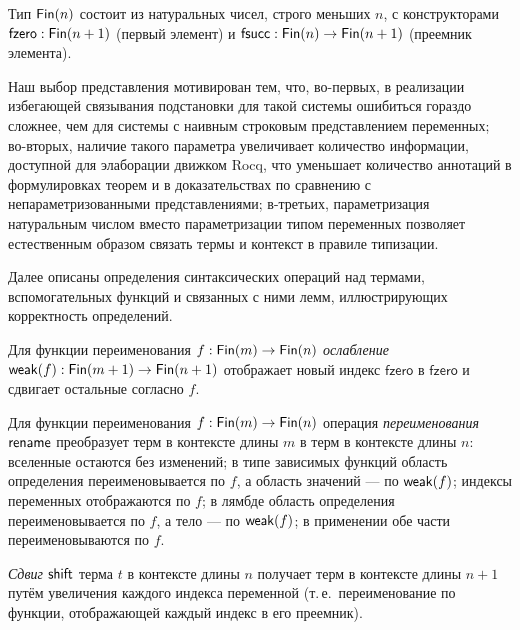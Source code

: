 \begin{definition}
Тип $\mathsf{Fin}(n)$ состоит из натуральных чисел, строго
меньших $n$, с конструкторами
$\mathsf{fzero}:\mathsf{Fin}(n+1)$ (первый элемент) и
$\mathsf{fsucc}:\mathsf{Fin}(n)\to\mathsf{Fin}(n+1)$
(преемник элемента).
\end{definition}

Наш выбор представления мотивирован тем, что,
во-первых, в реализации избегающей связывания
подстановки для такой системы ошибиться гораздо
сложнее, чем для системы с наивным строковым
представлением переменных; во-вторых, наличие такого
параметра увеличивает количество информации, доступной
для элаборации движком Rocq, что уменьшает количество
аннотаций в формулировках теорем и в доказательствах
по сравнению с непараметризованными представлениями;
в-третьих, параметризация натуральным числом вместо
параметризации типом переменных позволяет естественным
образом связать термы и контекст в правиле типизации.

Далее описаны определения синтаксических операций над
термами, вспомогательных функций и связанных с ними
лемм, иллюстрирующих корректность определений.

\begin{definition}
Для функции переименования $f : \mathsf{Fin}(m) \to \mathsf{Fin}(n)$
\emph{ослабление} $\mathsf{weak}(f) : \mathsf{Fin}(m+1) \to \mathsf{Fin}(n+1)$
отображает новый индекс $\mathsf{fzero}$ в
$\mathsf{fzero}$ и сдвигает остальные согласно $f$.
\end{definition}

\begin{definition}[Переименование]
Для функции переименования $f : \mathsf{Fin}(m) \to \mathsf{Fin}(n)$
операция \emph{переименования} $\mathsf{rename}$ преобразует
терм в контексте длины $m$ в терм в контексте длины
$n$: вселенные остаются без изменений; в типе зависимых
функций область определения переименовывается по $f$,
а область значений --- по $\mathsf{weak}(f)$; индексы
переменных отображаются по $f$; в лямбде область
определения переименовывается по $f$, а тело --- по
$\mathsf{weak}(f)$; в применении обе части переименовываются
по $f$.
\end{definition}

\begin{definition}[Сдвиг]
\emph{Сдвиг} $\mathsf{shift}$ терма $t$ в контексте длины $n$
получает терм в контексте длины $n+1$ путём увеличения
каждого индекса переменной (т.\,е.~переименование по
функции, отображающей каждый индекс в его преемник).
\end{definition}

